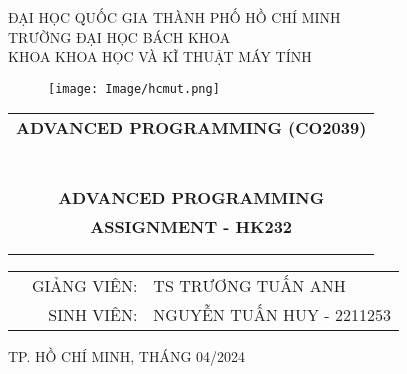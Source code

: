 



\begin{titlepage}
\begin{center}
ĐẠI HỌC QUỐC GIA THÀNH PHỐ HỒ CHÍ MINH \\
TRƯỜNG ĐẠI HỌC BÁCH KHOA \\
KHOA KHOA HỌC VÀ KĨ THUẬT MÁY TÍNH
\end{center}

\vspace{1cm}

\begin{figure}[h!]
\begin{center}
\texttt{[image: Image/hcmut.png]}
\end{center}
\end{figure}

\vspace{1cm}


\begin{center}
\begin{tabular}{c}
\multicolumn{1}{l}{\textbf{{\Large ADVANCED PROGRAMMING (CO2039)}}}\\
~~\\
\hline
\\
\\
\textbf{{\Huge ADVANCED PROGRAMMING}}\\
\textbf{{\Huge ASSIGNMENT - HK232}}\\
\\
\\
\hline
\end{tabular}
\end{center}

\vspace{2cm}

\begin{table}[h]
\begin{tabular}{rrl}
\hspace{5 cm} & GIẢNG VIÊN: & TS TRƯƠNG TUẤN ANH\\
& SINH VIÊN: & NGUYỄN TUẤN HUY - 2211253 \\
\end{tabular}
\end{table}

\vspace{2cm}

\begin{center}
{\footnotesize TP. HỒ CHÍ MINH, THÁNG 04/2024}
\end{center}
\end{titlepage}


